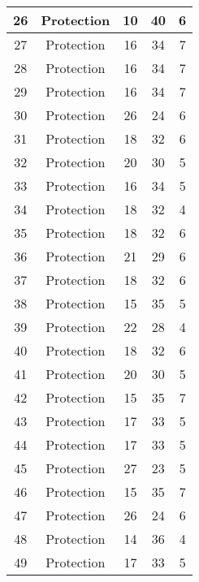 \documentclass[results.tex]{subfiles}
\begin{document}
\begin{center}
\begin{tabular}{| c || c | c | c | c |}
    \hline
    26 & Protection & 10 & 40 & 6 \\ 
    \hline
    27 & Protection & 16 & 34 & 7 \\ 
    \hline
    28 & Protection & 16 & 34 & 7 \\ 
    \hline
    29 & Protection & 16 & 34 & 7 \\ 
    \hline
    30 & Protection & 26 & 24 & 6 \\ 
    \hline
    31 & Protection & 18 & 32 & 6 \\ 
    \hline
    32 & Protection & 20 & 30 & 5 \\ 
    \hline
    33 & Protection & 16 & 34 & 5 \\ 
    \hline
    34 & Protection & 18 & 32 & 4 \\ 
    \hline
    35 & Protection & 18 & 32 & 6 \\ 
    \hline
    36 & Protection & 21 & 29 & 6 \\ 
    \hline
    37 & Protection & 18 & 32 & 6 \\ 
    \hline
    38 & Protection & 15 & 35 & 5 \\ 
    \hline
    39 & Protection & 22 & 28 & 4 \\ 
    \hline
    40 & Protection & 18 & 32 & 6 \\ 
    \hline
    41 & Protection & 20 & 30 & 5 \\ 
    \hline
    42 & Protection & 15 & 35 & 7 \\ 
    \hline
    43 & Protection & 17 & 33 & 5 \\ 
    \hline
    44 & Protection & 17 & 33 & 5 \\ 
    \hline
    45 & Protection & 27 & 23 & 5 \\ 
    \hline
    46 & Protection & 15 & 35 & 7 \\ 
    \hline
    47 & Protection & 26 & 24 & 6 \\ 
    \hline
    48 & Protection & 14 & 36 & 4 \\ 
    \hline
    49 & Protection & 17 & 33 & 5 \\ 
    \hline   \end{tabular}
\end{center}
\end{document}
